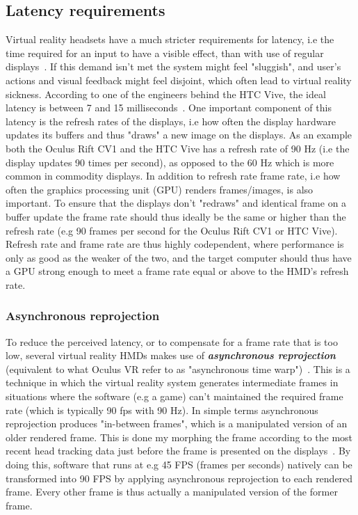 \subsection{Latency requirements}
Virtual reality headsets have a much stricter requirements for latency, i.e the time required for an input to have a visible effect, 
than with use of regular displays~\citep{ROADTOVR2013}. If this demand isn't met the system might feel "sluggish", and user's actions and 
visual feedback might feel disjoint, which often lead to virtual reality sickness. According to one of the engineers behind the HTC Vive, the ideal
latency is between 7 and 15 milliseconds~\citep{ARSTECHNICA2013}. One important component of this latency is the refresh rates of the displays, i.e 
how often the display hardware updates its buffers and thus "draws" a new image on the displays. As an example both the Oculus Rift CV1 and the HTC Vive
has a refresh rate of 90 Hz (i.e the display updates 90 times per second), as opposed to the 60 Hz which is more common in commodity displays.
In addition to refresh rate frame rate, i.e how often the graphics processing unit (GPU) renders frames/images, is also important. To ensure 
that the displays don't "redraws" and identical frame on a buffer update the frame rate should thus ideally be the same or higher than the refresh 
rate (e.g 90 frames per second for the Oculus Rift CV1 or HTC Vive). Refresh rate and frame rate are thus highly codependent, where performance is only as good as the weaker
of the two, and the target computer should thus have a GPU strong enough to meet a frame rate equal or above to the HMD's refresh rate. 

\subsubsection{Asynchronous reprojection}
To reduce the perceived latency, or to compensate for a frame rate that is too low, several virtual reality HMDs makes use of \textbf{\textit{asynchronous reprojection}} 
(equivalent to what Oculus VR refer to as "asynchronous time warp")~\citep{GD2016}. This is a technique in which the virtual reality system generates intermediate frames 
in situations where the software (e.g a game) can't maintained the required frame rate (which is typically 90 fps with 90 Hz). In simple terms asynchronous reprojection 
produces "in-between frames", which is a manipulated version of an older rendered frame. This is done my morphing the frame according to the most recent head tracking data just 
before the frame is presented on the displays~\citep{GD2016}. By doing this, software that runs at e.g 45 FPS (frames per seconds) natively can be transformed into 90 FPS by 
applying asynchronous reprojection to each rendered frame. Every other frame is thus actually a manipulated version of the former frame. 


